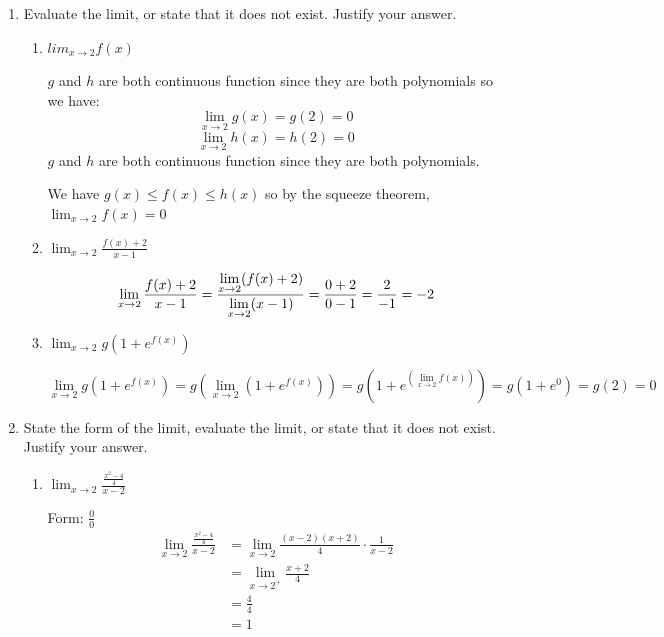 \documentclass[nooutcomes]{ximera}
\begin{document}
\begin{problem}
\begin{enumerate}
	\item	Evaluate the limit, or state that it does not exist.  Justify your answer.
		\begin{enumerate}
		\item $lim_{x \to 2} f(x)$
			\begin{freeResponse}
		$g$ and $h$ are both continuous function since they are both polynomials so we have:
		\[
		\lim_{x \to 2} g(x)=g(2)=0
		\]
		\[
		\lim_{x \to 2} h(x)=h(2)=0
		\]
		$g$ and $h$ are both continuous function since they are both polynomials.

		We have $g(x) \le f(x) \le h(x)$ so by the squeeze theorem, $\lim_{x \to 2} f(x)=0$
			\end{freeResponse}

		\item $\lim_{x \to 2} \frac{f(x)+2}{x-1}$
			\begin{freeResponse}
			\[
			\lim_{x \to 2}\frac{f(x)+2}{x-1}=\frac{\lim_{x \to 2}(f(x)+2)}{\lim_{x \to 2}(x-1)}\\
			= \frac{0+2}{0-1}\\
			= \frac{2}{-1}\\
			= -2
			\]
			\end{freeResponse}
		\item $\lim_{x \to 2} g(1+e^{f(x)})$
			\begin{freeResponse}
			\[
			\lim_{x \to 2} g(1+e^{f(x)})= g (\lim_{x \to 2} (1+e^{f(x)}))
			=g (1+e^{(\lim_{x \to 2}f(x))})
			=g(1+e^0)=g(2)=0
			\]
			\end{freeResponse}

		\end{enumerate}
	\item State the form of the limit, evaluate the limit, or state that it does not exist.  Justify your answer.
		\begin{enumerate}
		
		
		\item $\lim_{x \to 2}\frac{\frac{x^2-4}{4}}{x-2}$

		\begin{freeResponse}
		Form: $\frac{{0}}{0}$ \\
		\begin{align*}
		\lim_{x \to 2}\frac{\frac{x^2-4}{4}}{x-2}&=\lim_{x \to 2}\frac{(x-2)(x+2)}{4}\cdot \frac{1}{x-2}\\
		&= \lim_{x \to 2^+} \frac{x+2}{4}\\
		&= \frac{4}{4}\\
		&= 1
		\end{align*}
		\end{freeResponse}	


\end{enumerate}
\end{enumerate}
\end{problem}
\end{document}
